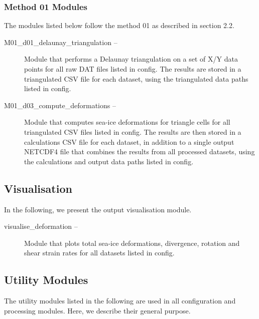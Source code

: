 \documentclass[draft]{agujournal2018}
\begin{document}
\subsubsection{Method 01 Modules}
The modules listed below follow the method 01 as described in section 2.2.
\begin{description}
   \item[M01\_d01\_delaunay\_triangulation --] Module that performs a Delaunay triangulation on a set of X/Y data points for all raw DAT files listed in config. The results are stored in a triangulated CSV file for each dataset, using the triangulated data paths listed in config.

   \item[M01\_d03\_compute\_deformations --]
    Module that computes sea-ice deformations for triangle cells for all triangulated CSV files listed in config. The results are then stored in a calculations CSV file for each dataset, in addition to a single output NETCDF4 file that combines the results from all processed datasets, using the calculations and output data paths listed in config.
    
\end{description}

\subsection{Visualisation}

In the following, we present the output visualisation module. 

\begin{description}
    
    \item[visualise\_deformation --] Module that plots total sea-ice deformations, divergence, rotation and shear strain rates for all datasets listed in config. 

\end{description}

\subsection{Utility Modules}

The utility modules listed in the following are used in all configuration and processing modules. Here, we describe their general purpose.
\end{document}
